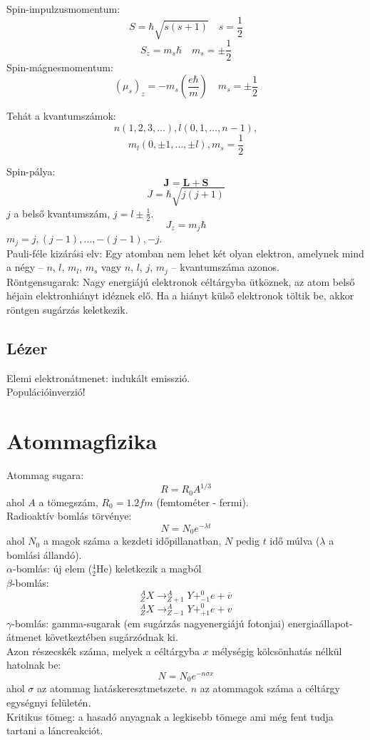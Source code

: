 \documentclass[12pt,a4paper,twocolumn]{article}
\begin{document}
  Spin-impulzusmomentum:
  \[S = \hbar\sqrt{s(s+1)} \quad s = \frac{1}{2}\]
  \[S_z = m_s\hbar \quad m_s = \pm\frac{1}{2}\]
  Spin-mágnesmomentum:
  \[(\mu_s)_z = -m_s\left(\frac{e\hbar}{m}\right) \quad m_s = \pm\frac{1}{2}\]

  Tehát a kvantumszámok:
  \[n(1,2,3,\ldots), l(0,1,\ldots,n-1),\]
  \[m_l(0,\pm 1,\ldots,\pm l), m_s=\frac{1}{2}\]

  Spin-pálya:
  \[\mathbf{J} = \mathbf{L} + \mathbf{S}\]
  \[J = \hbar\sqrt{j(j+1)}\]
  $j$ a belső kvantumszám, $j = l \pm \frac{1}{2}$.
  \[J_z = m_j\hbar\]
  $m_j = j, (j-1), \ldots, -(j-1), -j$.\\

  Pauli-féle kizárási elv: Egy atomban nem lehet két olyan elektron, amelynek mind a négy -- $n$, $l$, $m_l$, $m_s$ vagy
  $n$, $l$, $j$, $m_j$ -- kvantumszáma azonos.\\

  Röntgensugarak: Nagy energiájú elektronok céltárgyba ütköznek, az atom belső héjain elektronhiányt idéznek elő. Ha a hiányt
  külső elektronok töltik be, akkor röntgen sugárzás keletkezik.

  \subsection{Lézer}

  Elemi elektronátmenet: indukált emisszió.\\
  Populációinverzió!

  \section{Atommagfizika}

  Atommag sugara:
  \[R = R_0 A^{1/3}\]
  ahol $A$ a tömegszám, $R_0 = 1.2fm$ (femtométer - fermi).\\

  Radioaktív bomlás törvénye:
  \[N = N_0e^{-\lambda t}\]
  ahol $N_0$ a magok száma a kezdeti időpillanatban, $N$ pedig $t$ idő múlva ($\lambda$ a bomlási állandó).\\

  $\alpha$-bomlás: új elem ($^4_2$He) keletkezik a magból\\
  $\beta$-bomlás:
  \[^A_Z X \to ^A_{Z+1} Y + ^{0}_{-1}e + \overline{v}\]
  \[^A_Z X \to ^A_{Z-1} Y + ^{0}_{+1}e + v\]
  $\gamma$-bomlás: gamma-sugarak (em sugárzás nagyenergiájú fotonjai) energiaállapot-átmenet következtében sugárzódnak ki.\\

  Azon részecskék száma, melyek a céltárgyba $x$ mélységig kölcsönhatás nélkül hatolnak be:
  \[N = N_0e^{-n\sigma x}\]
  ahol $\sigma$ az atommag hatáskeresztmetszete. $n$ az atommagok száma a céltárgy egységnyi felületén.\\

  Kritikus tömeg: a hasadó anyagnak a legkisebb tömege ami még fent tudja tartani a láncreakciót.
\end{document}
